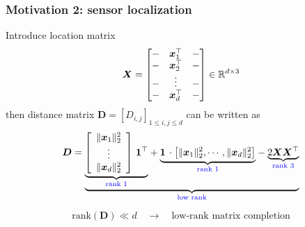 \documentclass[compress,
mathserif,wide,%
]{beamer}
\begin{document}
\begin{frame}
\frametitle{Motivation 2: sensor localization}

Introduce location matrix
$${\bm X} =\begin{bmatrix}
- &{\bm x}_1^{\top}  &- \\
- &{\bm x}_2^{\top} &-\\
- &\vdots &- \\
- &{\bm x}_d^{\top} &-
\end{bmatrix} \in\mathbb{R}^{d \times 3}$$
then distance matrix $\bm{D} = [D_{i,j}]_{1\leq i,j\leq d}$ can be written as
%
\[
\bm{D}=\underset{\textcolor{blue}{ \text{low rank}}}{\underbrace{\underset{\textcolor{blue}{ \text{rank 1}}}{\underbrace{\left[\begin{array}{c}
\|\bm{x}_{1}\|_{2}^{2}\\
\vdots\\
\|\bm{x}_{d}\|_{2}^{2}
\end{array}\right]\,\bm{1}^{\top}}}+\underset{\textcolor{blue}{ \text{rank 1}}}{\underbrace{\bm{1}\,\cdot\left[\|\bm{x}_{1}\|_{2}^{2},\cdots,\|\bm{x}_{d}\|_{2}^{2}\right]}}-\underset{\textcolor{blue}{ \text{rank 3}}}{\underbrace{2\bm{X}\bm{X}^{\top}}}}}
\]
%

\vfill

{

\begin{varblock}[\textwidth]{}
   \vspace{-1.5em}
   \begin{center}
     \[
        \text{rank}(\bm{D})  \ll d \quad \longrightarrow \quad  \text{low-rank matrix completion}
     \] 
   \end{center}
\end{varblock}
}


\end{frame}
\end{document}
